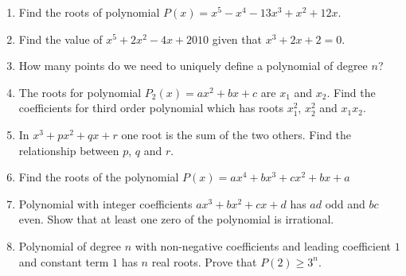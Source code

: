 \documentclass{article}
\begin{document}
\begin{enumerate}

\item
Find the roots of polynomial $P(x)=x^5-x^4-13x^3+x^2+12x$.

\item %
Find the value of $x^5+2x^2-4x+2010$ given that $x^3+2x+2=0$.

\item
How many points do we need to uniquely define a polynomial of degree $n$?

\item
The roots for polynomial $P_2(x)=ax^2+bx+c$ are $x_1$ and $x_2$. Find the coefficients for third order polynomial which has roots $x_1^2$, $x_2^2$ and $x_1x_2$.

\item %
In $x^3+px^2+qx+r$ one root is the sum of the two others. Find the relationship between $p$, $q$ and $r$. 

\item %
Find the roots of the polynomial $P(x)=ax^4+bx^3+cx^2+bx+a$


\item %
Polynomial with integer coefficients $ax^3+bx^2+cx+d$ has $ad$ odd and $bc$ even. Show that at least one zero of the polynomial is irrational.

\item %
Polynomial of degree $n$ with non-negative coefficients and leading coefficient $1$ and constant term $1$ has $n$ real roots. Prove that $P(2)\geq 3^n$.


\end{enumerate}
\end{document}
